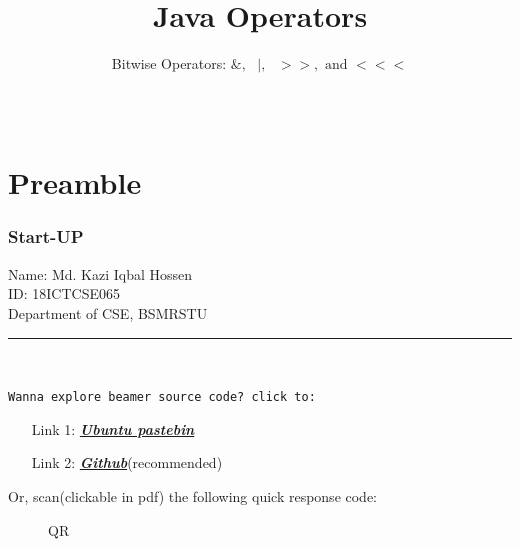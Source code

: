 \documentclass[table, compress]{beamer}
\title[Bitwise Operator]{Java Operators}
\subtitle{Bitwise Operators: $\&,\textrm{ }|,\textrm{ }>>,\textrm{ and }<<<$}
\author[S. I. Kiron]
{
	\myName \\
	\href{mailto:\myMail}{\myMail}
}
\date[Monday]{\dateOfSubmit}
\institute[\varsityShortName]{{\Large \textbf{\varsityName}}}
\affil{Department of CSE}
\begin{document}
{ %
	\frame
	{
		\titlepage
	}
}



\section{Preamble}


\begin{frame}
    \frametitle{Start-UP}
    \begin{center}
    {\scriptsize
        Name: Md. Kazi Iqbal Hossen\\
        ID: 18ICTCSE065\\
        Department of CSE, BSMRSTU\\
    }
        \textcolor{green}{\rule{11 cm}{3 pt}} \\
        
        {\tiny
        }
    \end{center}
    \texttt{\footnotesize Wanna explore beamer source code? click to:}
    {\footnotesize
    \begin{itemize}
        \item[Link 1:] \href{https://pastebin.ubuntu.com/p/dY8TWXY24C/}{\textit{\textbf{Ubuntu pastebin}}}
        \item[Link 2:] \href{https://github.com/Sofiullah-Iqbal-Kiron/LaTeX/blob/master/Presentation/Beamer/MAT205\%20Mid/MAT205\%20Mid.tex}{\textit{\textbf{Github}}}{\tiny (recommended)}
    \end{itemize}
    }
    Or, scan{\footnotesize(clickable in pdf)} the following quick response code:
    \begin{figure}
        {\small \caption*{QR}} %
        \centering
    \end{figure}
    \transsplitverticalout[duration=0.8]
\end{frame}
\end{document}
